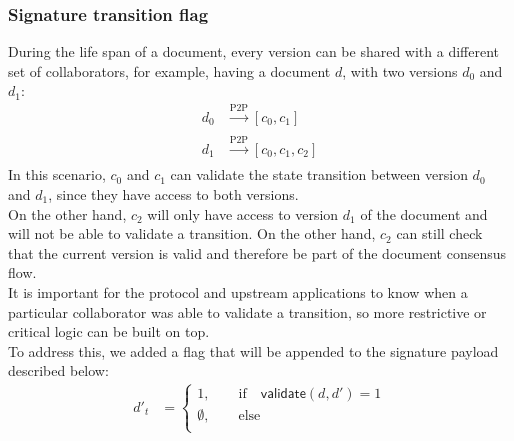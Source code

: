 \subsubsection{Signature transition flag}
During the life span of a document, every version can be shared with a different set of collaborators, for example, having a document $d$, with two versions $d_0$ and $d_1$: \\
\begin{eqnarray}
    d_0 & \xrightarrow[]{\text{P2P}} [c_0, c_1] \\
    d_1 & \xrightarrow[]{\text{P2P}} [c_0, c_1, c_2]
\end{eqnarray}
In this scenario, $c_0$ and $c_1$ can validate the state transition between version $d_0$ and $d_1$, since they have access to both versions. \\
On the other hand, $c_2$ will only have access to version $d_1$ of the document and will not be able to validate a transition. On the other hand, $c_2$ can still check that the current version is valid and therefore be part of the document consensus flow. \\
It is important for the protocol and upstream applications to know when a particular collaborator was able to validate a transition, so more restrictive or critical logic can be built on top. \\
To address this, we added a flag that will be appended to the signature payload described below:
\begin{equation}
\begin{split}
d'_{t} & =  \begin{cases}
  1, \quad \quad \text{if} \quad \mathsf{validate}(d, d')  = 1 \\      
  \emptyset,  \quad\quad\text{else} \\
\end{cases}
\end{split}
\end{equation}

